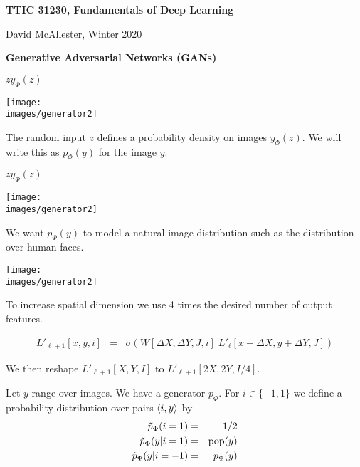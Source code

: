 





{\Huge

  \centerline{\bf TTIC 31230, Fundamentals of Deep Learning}
  \bigskip
  \centerline{David McAllester, Winter 2020}
  \vfill
  \centerline{\bf Generative Adversarial Networks (GANs)}
\vfill
\vfill


\bigskip
\centerline{$z$\hspace{5in}$y_\Phi(z)$}
\centerline{\texttt{[image: \\images/generator2]}}

\bigskip
The random input $z$ defines a probability density on images $y_\Phi(z)$.  We will write this as $p_\Phi(y)$ for the image $y$.


\bigskip
\centerline{$z$\hspace{5in}$y_\Phi(z)$}
\centerline{\texttt{[image: \\images/generator2]}}

\bigskip
We want $p_\Phi(y)$ to model a natural image distribution such as the distribution over human faces.


\centerline{\texttt{[image: \\images/generator2]}}

\vfill
To increase spatial dimension we use 4 times the desired number of output features.

\begin{eqnarray*}
  L'_{\ell+1}[x,y,i] & = & \sigma\left(W[\Delta X, \Delta Y, J,i]\; L'_\ell[x + \Delta X, y + \Delta Y, J]\right)
\end{eqnarray*}

\vfill
We then reshape $L'_{\ell+1}[X,Y,I]$ to $L'_{\ell+1}[2X,2Y,I/4]$.


Let $y$ range over images.  We have a generator $p_\Phi$. For $i \in \{-1,1\}$ we define a probability distribution over pairs
${\mbox{$\langle i,y\rangle$}}$ by
\begin{eqnarray*}
\tilde{p}_\Phi(i = 1) & = & 1/2 \\
\tilde{p}_\Phi(y|i=1) & =&  \mathrm{pop}(y) \\
\tilde{p}_\Phi(y|i=-1) & = & p_\Phi(y)
\end{eqnarray*}

}
